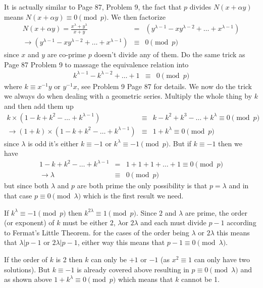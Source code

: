 \documentclass[aps,preprint,preprintnumbers,nofootinbib,showpacs,prd]{revtex4-1}
\newcommand{\nbea}{\begin{eqnarray*}}
\newcommand{\neea}{\end{eqnarray*}}
\begin{document}
It is actually similar to Page 87, Problem 9, the fact that $p$ divides $N(x + \alpha y)$ means $N(x + \alpha y) \equiv 0 \pmod{p}$. We then factorize
%
\nbea
N(x + \alpha y) = \frac{x^\lambda + y^\lambda}{x + y} & = & (y^{\lambda-1} - xy^{\lambda - 2} + \dots + x^{\lambda-1}) \\
\to (y^{\lambda-1} - xy^{\lambda - 2} + \dots + x^{\lambda-1}) & \equiv & 0 \pmod{p}
\neea
%
since $x$ and $y$ are co-prime $p$ doesn't divide any of them. Do the same trick as Page 87 Problem 9 to massage the equivalence relation into
%
\nbea
k^{\lambda-1} - k^{\lambda - 2} + \dots + 1 & \equiv & 0 \pmod{p}
\neea
%
where $k \equiv x^{-1} y$ or $y^{-1} x$, see Problem 9 Page 87 for details. We now do the trick we always do when dealing with a geometric series. Multiply the whole thing by $k$ and then add them up
%
\nbea
k \times (1 - k + k^2 - \dots + k^{\lambda - 1}) & \equiv & k - k^2 + k^3 - \dots + k^{\lambda} \equiv 0 \pmod{p} \\
\to (1 + k) \times (1 - k + k^2 - \dots + k^{\lambda - 1})  & \equiv & 1 + k^{\lambda} \equiv 0 \pmod{p}
\neea
%
since $\lambda$ is odd it's either $k \equiv -1$ or $k^{\lambda} \equiv -1 \pmod{p}$. But if $k \equiv -1$ then we have
%
\nbea
1 - k + k^2 - \dots + k^{\lambda - 1} & = & 1 + 1 + 1 + \dots + 1 \equiv 0 \pmod{p} \\
\to \lambda & \equiv & 0 \pmod{p}
\neea
%
but since both $\lambda$ and $p$ are both prime the only possibility is that $p = \lambda$ and in that case $p \equiv 0 \pmod{\lambda}$ which is the first result we need.

If $k^{\lambda} \equiv -1 \pmod{p}$ then $k^{2\lambda} \equiv 1 \pmod{p}$. Since $2$ and $\lambda$ are prime, the order (or exponent) of $k$ must be either $2$, $\lambda$or $2\lambda$ and each must divide $p - 1$ according to Fermat's Little Theorem. for the cases of the order being $\lambda$ or $2\lambda$ this means that $\lambda|p-1$ or $2\lambda|p-1$, either way this means that $p - 1 \equiv 0 \pmod{\lambda}$.

If the order of $k$ is 2 then $k$ can only be $+1$ or $-1$ (as $x^2 \equiv 1$ can only have two solutions). But $k \equiv -1$ is already covered above resulting in $p \equiv 0 \pmod{\lambda}$ and as shown above $1 + k^\lambda \equiv 0 \pmod{p}$ which means that $k$ cannot be 1.
\end{document}
